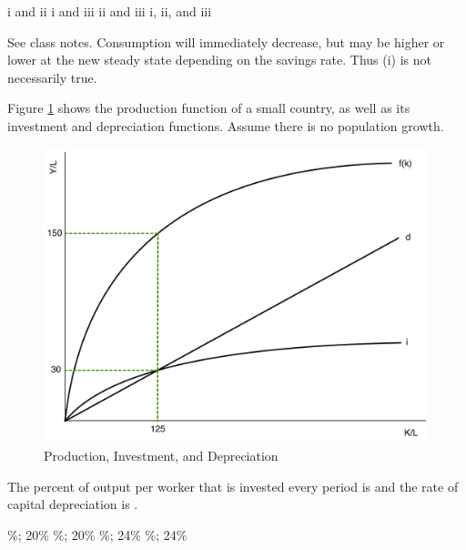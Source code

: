 \documentclass[addpoints,11pt]{exam}
\theoremstyle{definition}
\newcommand{\blank}[0]{\underline{\hspace{3cm}}}
\begin{document}
\begin{questions}
\newpage
	
	\begin{choices}
		\choice i and ii
		\choice i and iii
		\CorrectChoice ii and iii
		\choice i, ii, and iii
	\end{choices}
	
	\begin{solution}
		See class notes. Consumption will immediately decrease, but may be higher or lower at the new steady state depending on the savings rate. Thus (i) is not necessarily true.
	\end{solution}

	
	\question Figure \ref{MC22} shows the production function of a small country, as well as its investment and depreciation functions. Assume there is no population growth.
	
	
	\begin{figure}[H]
		\centering
		\includegraphics[scale=.4]{Final_MC22.pdf}
		\caption{Production, Investment, and Depreciation}
		\label{MC22}
	\end{figure}
	
	The percent of output per worker that is invested every period is \blank and the rate of capital depreciation is \blank.
	
	\begin{choices}
		\%; 20\%
		\%; 20\%
		\%; 24\%
		\%; 24\%
	\end{choices}
	

	
	
	

\end{questions}
\end{document}

